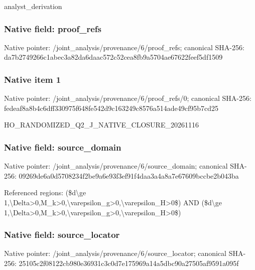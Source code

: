 \documentclass[10pt,a4paper]{article}
\begin{document}
\begingroup\raggedright\sloppy analyst\_\allowbreak{}derivation\par\endgroup

\subsubsection{Native field: proof\_\allowbreak{}refs}
Native pointer: /joint\_\allowbreak{}analysis/provenance/6/proof\_\allowbreak{}refs; canonical SHA-256: da7b2749266c1abec3a82da6daac572c52cea8fb9a5704ae67622feef5df1509

\subsubsection{Native item 1}
Native pointer: /joint\_\allowbreak{}analysis/provenance/6/proof\_\allowbreak{}refs/0; canonical SHA-256: fedeaf8a8b4c6dff330975f648fe542d9c163249c8576a514ade49cf95b7cd25

\begingroup\raggedright\sloppy HO\_\allowbreak{}RANDOMIZED\_\allowbreak{}Q2\_\allowbreak{}J\_\allowbreak{}NATIVE\_\allowbreak{}CLOSURE\_\allowbreak{}20261116\par\endgroup

\subsubsection{Native field: source\_\allowbreak{}domain}
Native pointer: /joint\_\allowbreak{}analysis/provenance/6/source\_\allowbreak{}domain; canonical SHA-256: 09269de6a0d5708234f2be9a6e93f3ef91f4daa3a4a8a7e67609bccbe2b043ba

\begingroup\raggedright\sloppy Referenced regions:\allowbreak{} (\$d\textbackslash{}ge 1,\allowbreak{}\textbackslash{}Delta>0,\allowbreak{}M\_\allowbreak{}k>0,\allowbreak{}\textbackslash{}varepsilon\_\allowbreak{}g>0,\allowbreak{}\textbackslash{}varepsilon\_\allowbreak{}H>0\$) AND (\$d\textbackslash{}ge 1,\allowbreak{}\textbackslash{}Delta>0,\allowbreak{}M\_\allowbreak{}k>0,\allowbreak{}\textbackslash{}varepsilon\_\allowbreak{}g>0,\allowbreak{}\textbackslash{}varepsilon\_\allowbreak{}H>0\$)\par\endgroup

\subsubsection{Native field: source\_\allowbreak{}locator}
Native pointer: /joint\_\allowbreak{}analysis/provenance/6/source\_\allowbreak{}locator; canonical SHA-256: 25105c2f08122cb980e36931c3c0d7e175969a14a5dbc90a27505af9591a095f
\end{document}
